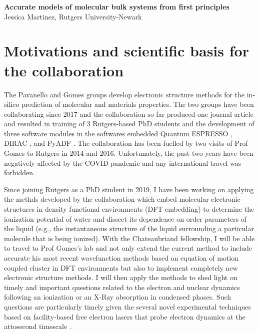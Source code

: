 \documentclass[notitlepage,12pt]{report}
\begin{document}
	\renewcommand\Affilfont{\itshape\small}
\begin{center}
    \textbf{\LARGE Accurate models of molecular bulk systems from first principles}\\
    Jessica Martinez, Rutgers University-Newark
\end{center}
\section{Motivations and scientific basis for the collaboration}

    The Pavanello and Gomes groups develop electronic structure methods for the in-silico prediction of molecular and materials properties. The two groups have been collaborating since 2017 and the collaboration so far produced one journal article \supercite{tolle2019charged} and resulted in training of 3 Rutgers-based PhD students and the development of three software modules in the softwares embedded Quantum ESPRESSO \supercite{}, DIRAC \supercite{}, and PyADF \supercite{}. The collaboration has been fuelled by two visits of Prof Gomes to Rutgers in 2014 and 2016. Unfortunately, the past two years have been negatively affected by the COVID pandemic and any international travel was forbidden. 

    Since joining Rutgers as a PhD student in 2019, I have been working on applying the methds developed by the collaboration which embed molecular  electronic structures in density functional environments (DFT embedding) to determine the ionization potential of water and dissect its dependence on order parameters of the liquid (e.g., the instantaneous structure of  the liquid surrounding a particular molecule that is being ionized).  With the Chateaubriand fellowship, I will be able to travel to Prof Gomes's lab and not only extend the current method to include accurate his most recent wavefunction methods based on equation of motion coupled cluster in DFT environments but also to implement completely new electronic structure methods. I will then apply the methods to shed light on timely and important questions related to the electron and nuclear dynamics following an ionization or an X-Ray absorption in condensed phases. Such questions are particularly timely given the several novel experimental techniques based on facility-based free electron lasers that probe electron dynamics at the attosecond timescale \supercite{}.  
\end{document}
